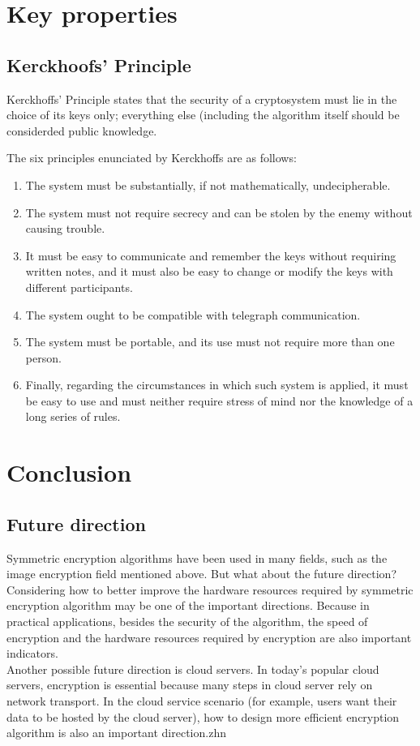 \documentclass[11pt]{article}
\begin{document}
\section{Key properties}

\subsection{Kerckhoofs' Principle}

Kerckhoffs' Principle\citep{Petitcolas2011} states that the security of a cryptosystem must lie in the choice of its keys only; everything else (including the algorithm itself should be considerded public knowledge.

The six principles enunciated by Kerckhoffs are as follows:

\begin{enumerate}
    \item The system must be substantially, if not mathematically, undecipherable.
    \item The system must not require secrecy and can be stolen by the enemy without causing trouble.
    \item It must be easy to communicate and remember the keys without requiring written notes, and it must also be easy to change or modify the keys with different participants.
    \item The system ought to be compatible with telegraph communication.
    \item The system must be portable, and its use must not require more than one person.
    \item Finally, regarding the circumstances in which such system is applied, it must be easy to use and must neither require stress of mind nor the knowledge of a long series of rules.
\end{enumerate}

\section{Conclusion}

\subsection{Future direction}
Symmetric encryption algorithms have been used in many fields, such as the image encryption field mentioned above. But what about the future direction?\\
Considering how to better improve the hardware resources required by symmetric encryption algorithm may be one of the important directions. Because in practical applications, besides the security of the algorithm, the speed of encryption and the hardware resources required by encryption are also important indicators.\\
Another possible future direction is cloud servers. In today's popular cloud servers, encryption is essential because many steps in cloud server rely on network transport. In the cloud service scenario (for example, users want their data to be hosted by the cloud server), how to design more efficient encryption algorithm is also an important direction.zhn
\end{document}
